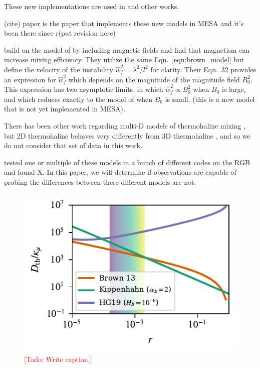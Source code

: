 These new implementations are used in \citep{bauer_bildsten_2019} and other works.

(cite) paper is the paper that implements these new models in MESA and it's been there since r(put revision here)


\citet{harrington} build on the model of \citet{brown_etal_2013} by including magnetic fields and find that magnetism can increase mixing efficiency.
They utilize the same Eqn.~\ref{eqn:brown_model} but define the velocity of the instability $\hat{w}_f^2 = \lambda^2/l^2$ for clarity. 
Their Eqn.~32 provides an expression for $\hat{w}_f^2$ which depends on the magnitude of the magnitude field $B_0^2$.
This expression has two asymptotic limits, in which $\hat{w}_f^2 \propto B_0^2$ when $B_0$ is large, and which reduces exactly to the model of \citet{brown_etal_2013} when $B_0$ is small.
(this is a new model that is not yet implemented in MESA).


There has been other work regarding multi-D models of thermohaline mixing \citep{denissenkov_2010, denissenkov_merryfield_2011}, but 2D thermohaline behaves very differently from 3D thermohaline \citep{garaud_brummell_2015}, and so we do not consider that set of data in this work.

\citet{lattanzio_etal_2015} tested one or multiple of these models in a bunch of different codes on the RGB and found X.
In this paper, we will determine if observations are capable of probing the differences between these different models are not.

\begin{figure}
    \centering
    \includegraphics[width=\columnwidth]{Nu_models_comparison.pdf}
    \caption{\textcolor{red}{[Todo: Write caption.]}}
    \label{fig:parameterization_compare}
\end{figure}
